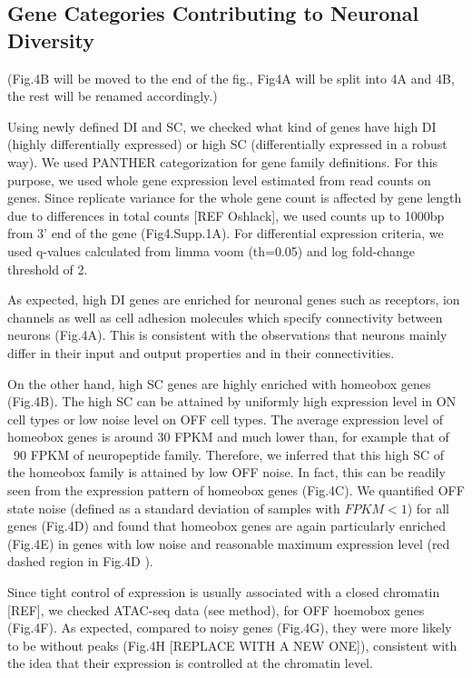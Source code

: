 \subsection{Gene Categories Contributing to Neuronal Diversity}

(Fig.4B will be moved to the end of the fig., Fig4A will be split into 4A and 4B, the rest will be renamed accordingly.)

Using newly defined DI and SC, we checked what kind of genes have high DI (highly differentially expressed) or high SC (differentially expressed in a robust way). We used PANTHER categorization for gene family definitions. For this purpose, we used whole gene expression level estimated from read counts on genes. Since replicate variance for the whole gene count is affected by gene length due to differences in total counts [REF Oshlack], we used counts up to 1000bp from 3' end of the gene (Fig4.Supp.1A). For differential expression criteria, we used q-values calculated from limma voom (th=0.05) and log fold-change threshold of 2.

As expected, high DI genes are enriched for neuronal genes such as receptors, ion channels as well as cell adhesion molecules which specify connectivity between neurons (Fig.4A). This is consistent with the observations that neurons mainly differ in their input and output properties and in their connectivities.

On the other hand, high SC genes are highly enriched with homeobox genes (Fig.4B). The high SC can be attained by uniformly high expression level in ON cell types or low noise level on OFF cell types. The average expression level of homeobox genes is around 30 FPKM and much lower than, for example that of ~90 FPKM of neuropeptide family. Therefore, we inferred that this high SC of the homeobox family is attained by low OFF noise. In fact, this can be readily seen from the expression pattern of homeobox genes (Fig.4C). We quantified OFF state noise (defined as a standard deviation of samples with $FPKM<1$) for all genes (Fig.4D) and found that homeobox genes are again particularly enriched (Fig.4E) in genes with low noise and reasonable maximum expression level (red dashed region in Fig.4D ).

Since tight control of expression is usually associated with a closed chromatin [REF], we checked ATAC-seq data (see method), for OFF hoemobox genes (Fig.4F). As expected, compared to noisy genes (Fig.4G), they were more likely to be without peaks (Fig.4H [REPLACE WITH A NEW ONE]), consistent with the idea that their expression is controlled at the chromatin level.

